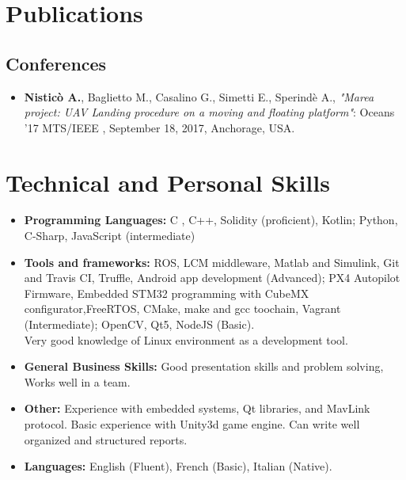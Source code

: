 \documentclass[10pt,a4paper,sans]{moderncv}        %
\begin{document}
\vspace{5pt}

\section{Publications}

\vspace{5pt}

\subsection{Conferences}
\vspace{2pt}
\begin{itemize}
\item \textbf{Nisticò A.}, Baglietto M., Casalino G., Simetti E., Sperindè A.,   \textit{"Marea project: UAV Landing procedure on a
moving and floating platform"}: Oceans ’17 MTS/IEEE , September 18, 2017, Anchorage, USA.
\end{itemize}
\vspace{5pt}

\section{Technical and Personal Skills}

\vspace{6pt}

\begin{itemize}

\item \textbf{Programming Languages:} C , C++, Solidity (proficient), Kotlin; Python, C-Sharp, JavaScript (intermediate)
\vspace{6pt}

\item \textbf{Tools and frameworks:} ROS, LCM middleware, Matlab and Simulink, Git and Travis CI,  Truffle, Android app development (Advanced); PX4 Autopilot Firmware, Embedded STM32 programming with CubeMX configurator,FreeRTOS, CMake, make and gcc toochain, Vagrant (Intermediate); OpenCV, Qt5, NodeJS (Basic).\\
Very good knowledge of Linux environment as a development tool. 
\vspace{6pt}

\item \textbf{General Business Skills:} Good presentation skills and problem solving, Works well in a team.

\vspace{6pt}

\item \textbf{Other:} Experience with embedded systems, Qt libraries, and MavLink protocol. Basic experience with Unity3d game engine. Can write well organized and structured reports.

\vspace{6pt}

\item \textbf{Languages:} English (Fluent), French (Basic), Italian (Native).

\end{itemize}
\end{document}
